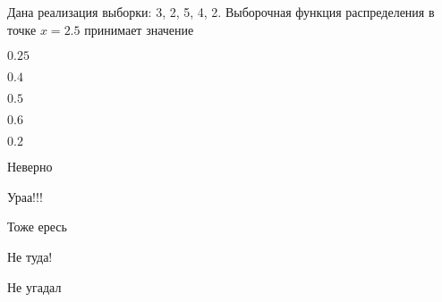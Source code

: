 
\begin{question}
Дана реализация выборки: 3, 2, 5, 4, 2. Выборочная функция распределения
в точке \(x=2.5\) принимает значение
\begin{answerlist}
  \item \(0.25\)
  \item \(0.4\)
  \item \(0.5\)
  \item \(0.6\)
  \item \(0.2\)
\end{answerlist}
\end{question}

\begin{solution}
\begin{answerlist}
  \item Неверно
  \item Ураа!!!
  \item Тоже ересь
  \item Не туда!
  \item Не угадал
\end{answerlist}
\end{solution}

